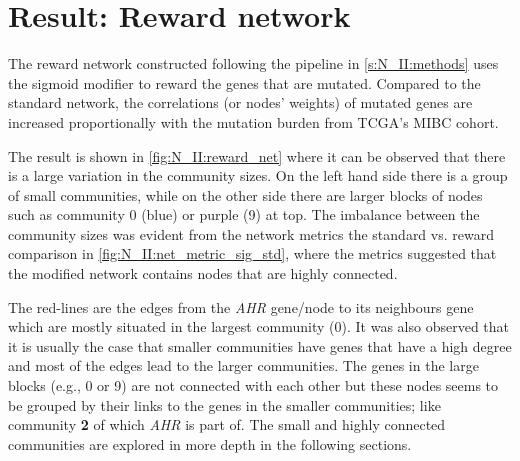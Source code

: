 \section{Result: Reward network} \label{s:N_II:rwd}

\vspace{3mm}
\vspace{3mm}

The reward network constructed following the pipeline in \cref{s:N_II:methods} uses the sigmoid modifier to reward the genes that are mutated. Compared to the standard network, the correlations (or nodes' weights) of mutated genes are increased proportionally with the mutation burden from TCGA's MIBC cohort. 

The result is shown in \cref{fig:N_II:reward_net} where it can be observed that there  is a large variation in the community sizes. On the left hand side there is a group of small communities, while on the other side there are larger blocks of nodes such as community 0 (blue) or purple (9) at top. The imbalance between the community sizes was evident from the network metrics the standard vs. reward comparison in \cref{fig:N_II:net_metric_sig_std}, where the metrics suggested that the modified network contains nodes that are highly connected.

The red-lines are the edges from the \textit{AHR} gene/node to its neighbours gene which are mostly situated in the largest community (0). It was also observed that it is usually the case that smaller communities have genes that have a high degree and most of the edges lead to the larger communities. The genes in the large blocks (e.g., 0 or 9) are not connected with each other but these nodes seems to be grouped by their links to the genes in the smaller communities; like community \textbf{2} of which \textit{AHR} is part of. The small and highly connected communities are explored in more depth in the following sections.

